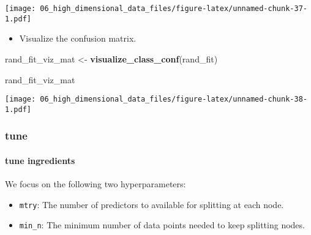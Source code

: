 \documentclass[
]{book}
\newenvironment{Shaded}{\begin{snugshade}}{\end{snugshade}}
\newcommand{\KeywordTok}[1]{\textcolor[rgb]{0.13,0.29,0.53}{\textbf{#1}}}
\newcommand{\NormalTok}[1]{#1}
\newcommand{\StringTok}[1]{\textcolor[rgb]{0.31,0.60,0.02}{#1}}
\providecommand{\tightlist}{%
  \setlength{\itemsep}{0pt}\setlength{\parskip}{0pt}}
\begin{document}
\texttt{[image: 06\_high\_dimensional\_data\_files/figure-latex/unnamed-chunk-37-1.pdf]}

\begin{itemize}
\tightlist
\item
  Visualize the confusion matrix.
\end{itemize}

\begin{Shaded}
\begin{Highlighting}[]
\NormalTok{rand\_fit\_viz\_mat \textless{}{-}}\StringTok{ }\KeywordTok{visualize\_class\_conf}\NormalTok{(rand\_fit)}

\NormalTok{rand\_fit\_viz\_mat}
\end{Highlighting}
\end{Shaded}

\texttt{[image: 06\_high\_dimensional\_data\_files/figure-latex/unnamed-chunk-38-1.pdf]}

\hypertarget{tune-2}{%
\subsubsection{tune}\label{tune-2}}

\hypertarget{tune-ingredients-2}{%
\paragraph{tune ingredients}\label{tune-ingredients-2}}

We focus on the following two hyperparameters:

\begin{itemize}
\item
  \texttt{mtry}: The number of predictors to available for splitting at each node.
\item
  \texttt{min\_n}: The minimum number of data points needed to keep splitting nodes.
\end{itemize}
\end{document}
